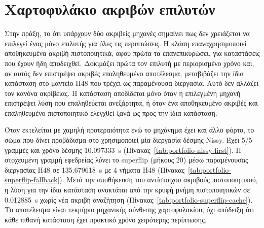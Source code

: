 \section{Χαρτοφυλάκιο ακριβών επιλυτών}
\label{sec:experiments-portfolio}

Στην πράξη, το ότι υπάρχουν δύο ακριβείς μηχανές σημαίνει πως δεν χρειάζεται να επιλεγεί ένας μόνο επιλυτής για όλες τις περιπτώσεις. Η κλάση  επαναχρησιμοποιεί αποθηκευμένα ακριβή πιστοποιητικά, αφού πρώτα τα επανεπικυρώσει, για καταστάσεις που έχουν ήδη αποδειχθεί. Δοκιμάζει πρώτα τον επιλυτή  με περιορισμένο χρόνο και, αν αυτός δεν επιστρέψει ακριβές επαληθευμένο αποτέλεσμα, μεταβιβάζει την ίδια κατάσταση στο μαντείο H48 που τρέχει ως παραμένουσα διεργασία. Αυτό δεν αλλάζει τον κανόνα ακρίβειας. Η κατάσταση  αποδίδεται μόνο όταν η επιλεγμένη μηχανή επιστρέψει λύση που επαληθεύεται ανεξάρτητα, ή όταν ένα αποθηκευμένο ακριβές και επαληθευμένο πιστοποιητικό ελεγχθεί ξανά ως προς την ίδια κατάσταση.

Όταν εκτελείται με χαμηλή προτεραιότητα ενώ το μηχάνημα έχει και άλλο φόρτο, το σώμα που δίνει προβάδισμα στο  χρησιμοποιεί μία διεργασία δέσμης Nissy. Έχει 5/5 γραμμές  και χρόνο δέσμης 10.097333~s (Πίνακας~\ref{tab:portfolio-nissy-first}). Η στοχευμένη γραμμή εφεδρείας λύνει το superflip (μήκους 20) μέσω παραμένουσας διεργασίας H48 σε 135.679618~s με 4 νήματα H48 (Πίνακας~\ref{tab:portfolio-superflip-fallback}). Μετά την αποθήκευση του αντίστοιχου ακριβούς πιστοποιητικού, η λύση για την ίδια κατάσταση ανακτάται από την κρυφή μνήμη πιστοποιητικών σε 0.012885~s χωρίς νέα ακριβή αναζήτηση (Πίνακας~\ref{tab:portfolio-superflip-cache}). Το αποτέλεσμα είναι τεκμήριο μηχανικής σύνθεσης χαρτοφυλακίου, όχι απόδειξη ότι κάθε πιθανή κατάσταση έχει πρακτικό χρόνο χειρότερης περίπτωσης.

\begin{table}[htbp]\centering

\caption[Σώμα του χαρτοφυλακίου με προτεραιότητα στο Nissy]{Σώμα του χαρτοφυλακίου ακριβών επιλυτών με προτεραιότητα στο Nissy, σε εκτέλεση χαμηλής προτεραιότητας: 5/5 γραμμές  μέσω μίας διεργασίας δέσμης. Πηγή: τεκμήριο  του .}
\label{tab:portfolio-nissy-first}
\end{table}

\begin{table}[htbp]\centering

\caption[Γραμμή εφεδρείας του χαρτοφυλακίου για το superflip]{Γραμμή εφεδρείας του χαρτοφυλακίου για το superflip: ακριβής λύση μήκους 20 μέσω παραμένουσας διεργασίας H48 σε 135.679618~s. Πηγή: τεκμήριο  του .}
\label{tab:portfolio-superflip-fallback}
\end{table}

